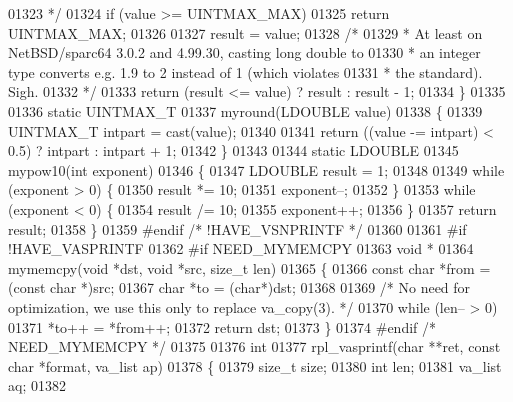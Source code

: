 \begin{DoxyCode}
{{{{{{{{{{01323 \textcolor{comment}{     */}
01324     \textcolor{keywordflow}{if} (value >= UINTMAX\_MAX)
01325         \textcolor{keywordflow}{return} UINTMAX\_MAX;
01326 
01327     result = value;
01328     \textcolor{comment}{/*}
01329 \textcolor{comment}{     * At least on NetBSD/sparc64 3.0.2 and 4.99.30, casting long double to}
01330 \textcolor{comment}{     * an integer type converts e.g. 1.9 to 2 instead of 1 (which violates}
01331 \textcolor{comment}{     * the standard).  Sigh.}
01332 \textcolor{comment}{     */}
01333     \textcolor{keywordflow}{return} (result <= value) ? result : result - 1;
01334 \}
01335 
01336 \textcolor{keyword}{static} UINTMAX\_T
01337 myround(LDOUBLE value)
01338 \{
01339     UINTMAX\_T intpart = cast(value);
01340 
01341     \textcolor{keywordflow}{return} ((value -= intpart) < 0.5) ? intpart : intpart + 1;
01342 \}
01343 
01344 \textcolor{keyword}{static} LDOUBLE
01345 mypow10(\textcolor{keywordtype}{int} exponent)
01346 \{
01347     LDOUBLE result = 1;
01348 
01349     \textcolor{keywordflow}{while} (exponent > 0) \{
01350         result *= 10;
01351         exponent--;
01352     \}
01353     \textcolor{keywordflow}{while} (exponent < 0) \{
01354         result /= 10;
01355         exponent++;
01356     \}
01357     \textcolor{keywordflow}{return} result;
01358 \}
01359 \textcolor{preprocessor}{#endif  }\textcolor{comment}{/* !HAVE\_VSNPRINTF */}\textcolor{preprocessor}{}
01360 
01361 \textcolor{preprocessor}{#if !HAVE\_VASPRINTF}
01362 \textcolor{preprocessor}{#if NEED\_MYMEMCPY}
01363 \textcolor{keywordtype}{void} *
01364 mymemcpy(\textcolor{keywordtype}{void} *dst, \textcolor{keywordtype}{void} *src, \textcolor{keywordtype}{size\_t} len)
01365 \{
01366     \textcolor{keyword}{const} \textcolor{keywordtype}{char} *from = (\textcolor{keyword}{const} \textcolor{keywordtype}{char} *)src;
01367     \textcolor{keywordtype}{char} *to = (\textcolor{keywordtype}{char}*)dst;
01368 
01369     \textcolor{comment}{/* No need for optimization, we use this only to replace va\_copy(3). */}
01370     \textcolor{keywordflow}{while} (len-- > 0)
01371         *to++ = *from++;
01372     \textcolor{keywordflow}{return} dst;
01373 \}
01374 \textcolor{preprocessor}{#endif  }\textcolor{comment}{/* NEED\_MYMEMCPY */}\textcolor{preprocessor}{}
01375 
01376 \textcolor{keywordtype}{int}
01377 rpl\_vasprintf(\textcolor{keywordtype}{char} **ret, \textcolor{keyword}{const} \textcolor{keywordtype}{char} *format, va\_list ap)
01378 \{
01379     \textcolor{keywordtype}{size\_t} size;
01380     \textcolor{keywordtype}{int} len;
01381     va\_list aq;
01382 
}}}}}}}}}}
\end{DoxyCode}
